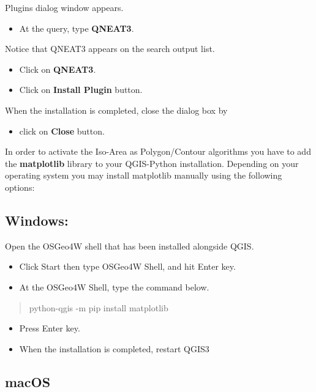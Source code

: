 \documentclass[
  letterpaper,
  DIV=11,
  numbers=noendperiod]{scrreprt}
\providecommand{\tightlist}{%
  \setlength{\itemsep}{0pt}\setlength{\parskip}{0pt}}\usepackage{longtable,booktabs,array}
\begin{document}
Plugins dialog window appears.

\begin{itemize}
\tightlist
\item
  At the query, type \textbf{QNEAT3}.
\end{itemize}

Notice that QNEAT3 appears on the search output list.

\begin{itemize}
\item
  Click on \textbf{QNEAT3}.
\item
  Click on \textbf{Install Plugin} button.
\end{itemize}

When the installation is completed, close the dialog box by

\begin{itemize}
\tightlist
\item
  click on \textbf{Close} button.
\end{itemize}

In order to activate the Iso-Area as Polygon/Contour algorithms you have
to add the \textbf{matplotlib} library to your QGIS-Python installation.
Depending on your operating system you may install matplotlib manually
using the following options:

\hypertarget{windows}{%
\subsection{Windows:}\label{windows}}

Open the OSGeo4W shell that has been installed alongside QGIS.

\begin{itemize}
\item
  Click Start then type OSGeo4W Shell, and hit Enter key.
\item
  At the OSGeo4W Shell, type the command below.
\end{itemize}

\begin{quote}
python-qgis -m pip install matplotlib
\end{quote}

\begin{itemize}
\tightlist
\item
  Press Enter key.
\item
  When the installation is completed, restart QGIS3
\end{itemize}

\hypertarget{macos}{%
\subsection{macOS}\label{macos}}
\end{document}
